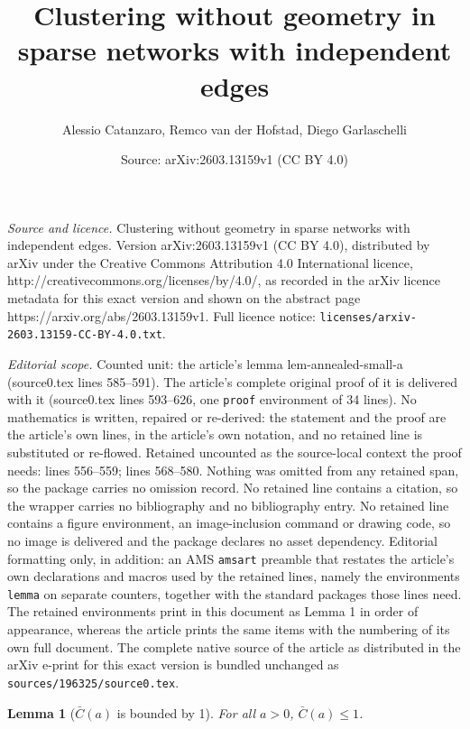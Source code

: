 \documentclass[10pt,a4paper]{amsart}
\title{Clustering without geometry in sparse networks with independent edges}
\author{Alessio Catanzaro, Remco van der Hofstad, Diego Garlaschelli}
\date{Source: arXiv:2603.13159v1 (CC BY 4.0)}
\newtheorem{lemma}{Lemma}
\begin{document}
\maketitle

\noindent\emph{Source and licence.} Clustering without geometry in sparse networks with independent edges. Version arXiv:2603.13159v1 (CC BY 4.0), distributed by arXiv under the Creative Commons Attribution 4.0 International licence, http://creativecommons.org/licenses/by/4.0/, as recorded in the arXiv licence metadata for this exact version and shown on the abstract page https://arxiv.org/abs/2603.13159v1. Full licence notice: \texttt{licenses/arxiv-2603.13159-CC-BY-4.0.txt}.\par\smallskip

\noindent\textit{Editorial scope.} Counted unit: the article's lemma lem-annealed-small-a (source0.tex lines 585--591). The article's complete original proof of it is delivered with it (source0.tex lines 593--626, one \texttt{proof} environment of 34 lines). No mathematics is written, repaired or re-derived: the statement and the proof are the article's own lines, in the article's own notation, and no retained line is substituted or re-flowed.  Retained uncounted as the source-local context the proof needs: lines 556--559; lines 568--580.  Nothing was omitted from any retained span, so the package carries no omission record.  No retained line contains a citation, so the wrapper carries no bibliography and no bibliography entry.  No retained line contains a figure environment, an image-inclusion command or drawing code, so no image is delivered and the package declares no asset dependency.  Editorial formatting only, in addition: an AMS \texttt{amsart} preamble that restates the article's own declarations and macros used by the retained lines, namely the environments \texttt{lemma} on separate counters, together with the standard packages those lines need.  The retained environments print in this document as Lemma 1 in order of appearance, whereas the article prints the same items with the numbering of its own full document.  The complete native source of the article as distributed in the arXiv e-print for this exact version is bundled unchanged as \texttt{sources/196325/source0.tex}.
\begin{lemma}[$\bar{C}(a)$ is bounded by 1]
\label{lem-annealed-bd-1}
For all $a>0$, $\bar{C}(a)\leq 1$.
\end{lemma}
\end{document}
